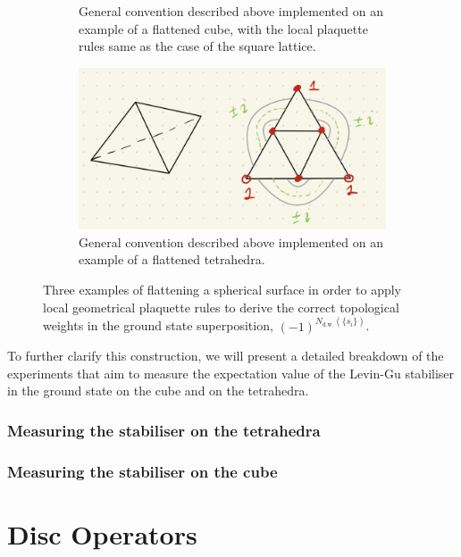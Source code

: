 \documentclass[a4paper,twocolumn,11pt]{quantumarticle}
\begin{document}
\begin{figure}
\begin{subfigure}[b]{0.4\textwidth}
         \caption{General convention described above implemented on an example of a flattened cube, with the local plaquette rules same as the case of the square lattice.}
         \label{fig:surg_cube}
     \end{subfigure}
     \hfill
     \begin{subfigure}[b]{0.4\textwidth}
         \centering
         \includegraphics[width=\textwidth]{Figures/tetrahedra_surg.png}
         \caption{General convention described above implemented on an example of a flattened tetrahedra.}
         \label{fig:surg_tetra}
     \end{subfigure}
        \caption{Three examples of flattening a spherical surface in order to apply local geometrical plaquette rules to derive the correct topological weights in the ground state superposition, $(-1)^{N_\text{d.w.}(\{s_i\})}$. }
        \label{fig:surg_all}
\end{figure}

To further clarify this construction, we will present a detailed breakdown of the experiments that aim to measure the expectation value of the Levin-Gu stabiliser in the ground state on the cube and on the tetrahedra.

\subsubsection{Measuring the stabiliser on the tetrahedra}

\subsubsection{Measuring the stabiliser on the cube}

\section{Disc Operators}
\end{document}
